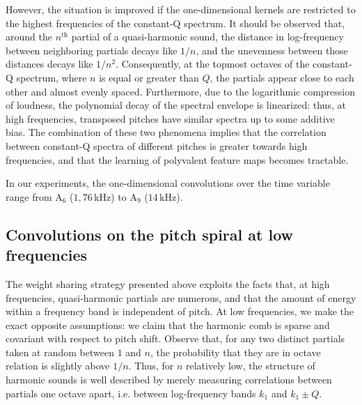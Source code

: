 \documentclass{article}
\makeatletter
\newcommand*{\ie}{i.e.\@\xspace}
\makeatother
\begin{document}
However, the situation is improved if the one-dimensional
kernels are restricted to the highest frequencies of the constant-Q spectrum.
It should be observed that, around the $n^{\textrm{th}}$ partial of a quasi-harmonic sound,
the distance in log-frequency between neighboring partials decays like $1/n$,
and the unevenness between those distances decays like $1/n^2$.
Consequently, at the topmost octaves of the constant-Q spectrum, 
where $n$ is equal or greater than $Q$, the partials appear close to each other and almost
evenly spaced.
Furthermore, due to the logarithmic compression of loudness, the polynomial decay
of the spectral envelope is linearized: thus, at high frequencies, transposed pitches
have similar spectra up to some additive bias.
The combination of these two phenomena implies that the correlation between
constant-Q spectra of different pitches is greater towards high frequencies, and that
the learning of polyvalent feature maps becomes tractable.

In our experiments, the one-dimensional convolutions over the time variable
range from
$\mathrm{A_6}$ ($1,76\,\mathrm{kHz}$) to
$\mathrm{A_9}$ ($14\,\mathrm{kHz}$).

\subsection{Convolutions on the pitch spiral at low frequencies}
The weight sharing strategy presented above exploits the facts that,
at high frequencies, quasi-harmonic partials are numerous, and that the
amount of energy within a frequency band is independent of pitch.
At low frequencies, we make the exact opposite assumptions: we claim
that the harmonic comb is sparse and covariant with respect to pitch shift.
Observe that, for any two distinct partials taken at random between $1$ and $n$,
the probability that they are in octave relation is slightly above $1/n$.
Thus, for $n$ relatively low, the structure of harmonic sounds is well
described by merely measuring correlations between partials one octave apart,
\ie between log-frequency bands $k_1$ and $k_1 \pm Q$.
\end{document}
